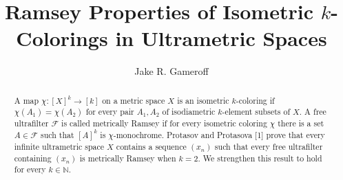 
\makeatletter
\def\@settitle{\begin{center}%
  \baselineskip14\p@\relax
    \normalfont\Large%
\@title
  \end{center}%
}
\makeatother

\title{Ramsey Properties of Isometric $k$-Colorings in Ultrametric Spaces}
\author{Jake R. Gameroff}

\begin{abstract}
	A map \( \chi : [X]^{k} \to [k] \) on a metric space \( X \) is an isometric \( k \)-coloring if \( \chi(A_1) = \chi(A_2) \) for every pair \( A_1,A_2 \) of isodiametric \( k \)-element subsets of \( X \). A free ultrafilter \( \mathcal{F}  \) is called metrically Ramsey if for every isometric coloring \( \chi \) there is a set \( A \in \mathcal{F}  \) such that \( [A]^{k}  \) is \( \chi \)-monochrome. Protasov and Protasova [1] prove that every infinite ultrametric space \( X \) contains a sequence \( (x_{n}) \) such that every free ultrafilter containing \( (x_{n}) \) is metrically Ramsey when \( k = 2 \). We strengthen this result to hold for every \( k \in \mathbb{N}  \).
\end{abstract}
\maketitle





